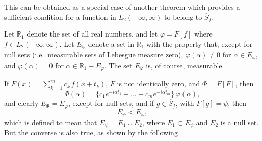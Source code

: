 This can be obtained as a special case of another theorem which provides a sufficient condition for a function in $L_{2}(-\infty,\infty)$ to belong to $\overline{S}_{f}$.

Let $\mathbb R_{1}$ denote the set of all real numbers, and let $\varphi=F[f]$ where $f\in L_{2}(-\infty,\infty)$. Let $E_{\varphi}$ denote a set in $\mathbb R_{1}$ with the property that, except for null sets (i.e.\ measurable sets of Lebesgue measure zero), $\varphi(\alpha)\neq 0$ for $\alpha\in E_{\varphi}$, and $\varphi(\alpha)=0$ for $\alpha\in\mathbb R_{1}-E_{\varphi}$. The set $E_{\varphi}$ is, of course, measurable.

If $F(x)=\sum_{k=1}^{m}c_{k}\,f(x+t_{k})$, $F$ is not identically zero, and $\Phi=F[F]$, then
\begin{equation}\tag{4.1}\label{eq:II-4.1}
\Phi(\alpha)=\{c_{1}e^{-i\alpha t_{1}}+\dots+c_{m}e^{-i\alpha t_{m}}\}\,\varphi(\alpha),
\end{equation}
and clearly $E_{\Phi}=E_{\varphi}$, except for null sets, and if $g\in\overline{S}_{f}$, with $F[g]=\psi$, then
\begin{equation}\tag{4.2}\label{eq:II-4.2}
E_{\psi}<E_{\varphi},
\end{equation}
which is defined to mean that $E_{\psi}=E_{1}\cup E_{2}$, where $E_{1}\subset E_{\psi}$ and $E_{2}$ is a null set. But the converse is also true, as shown by the following

